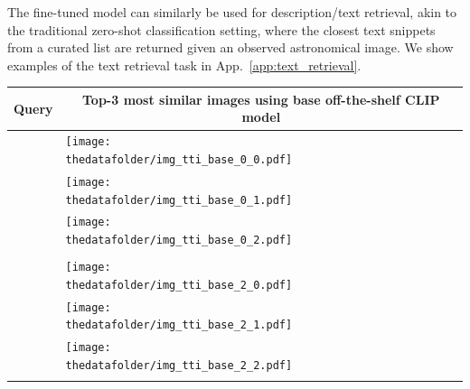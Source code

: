 \documentclass{article} %
\begin{document}
  The fine-tuned model can similarly be used for description/text retrieval, akin to the traditional zero-shot classification setting, where the closest text snippets from a curated list are returned given an observed astronomical image. We show examples of the text retrieval task in App.~\ref{app:text_retrieval}.

   \begin{table}[h!]
     \centering
     \begin{tabular}{m{2.7cm} p{2.9cm} p{2.9cm} p{2.9cm}}
         \toprule
         \centering \bfseries Query & \multicolumn{3}{c}{\bfseries{Top-3 most similar images using \textcolor{deeppurple}{base off-the-shelf CLIP model}}} \tabularnewline
         \midrule
          \texttt{} \vspace{20mm} & \centering \texttt{[image: \\thedatafolder/img\_tti\_base\_0\_0.pdf]} \\  & \centering \texttt{[image: \\thedatafolder/img\_tti\_base\_0\_1.pdf]} \\  & \centering \texttt{[image: \\thedatafolder/img\_tti\_base\_0\_2.pdf]} \\  \tabularnewline
         \midrule
         \texttt{} \vspace{20mm} & \centering \texttt{[image: \\thedatafolder/img\_tti\_base\_2\_0.pdf]} \\  & \centering \texttt{[image: \\thedatafolder/img\_tti\_base\_2\_1.pdf]} \\  & \centering \texttt{[image: \\thedatafolder/img\_tti\_base\_2\_2.pdf]} \\  \tabularnewline 

\end{tabular}
\end{table}
\end{document}
